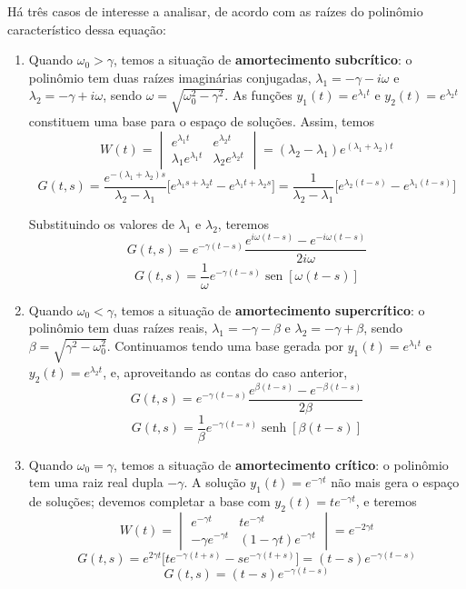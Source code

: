\documentclass[12pt,a4paper,oneside]{memoir}
\DeclareMathOperator{\sen}{sen}
\DeclareMathOperator{\senh}{senh}
\begin{document}
Há três casos de interesse a analisar, de acordo com as raízes do polinômio característico dessa equação:
\begin{enumerate}

  \item Quando $\omega_0 > \gamma$, temos a situação de \textbf{amortecimento subcrítico}: o polinômio tem duas raízes imaginárias conjugadas, $\lambda_1 = -\gamma - i\omega$ e $\lambda_2 = -\gamma + i\omega$, sendo $\omega = \sqrt{\omega_0^2 - \gamma^2}$.  As funções $y_1(t) = e^{\lambda_1 t}$ e $y_2(t) = e^{\lambda_2 t}$ constituem uma base para o espaço de soluções.  Assim, temos
  \[
    W(t)
    =
      \begin{vmatrix}
                  e^{\lambda_1 t}  &            e^{\lambda_2 t} \\
        \lambda_1 e^{\lambda_1 t}  &  \lambda_2 e^{\lambda_2 t}
      \end{vmatrix}
    =
      (\lambda_2 - \lambda_1) e^{(\lambda_1 + \lambda_2)t}
  \]
  \[
    G(t, s)
    =
      \frac{ e^{-(\lambda_1 + \lambda_2)s} }{ \lambda_2 - \lambda_1 }
      \Big[
        e^{\lambda_1 s + \lambda_2 t} -
        e^{\lambda_1 t + \lambda_2 s}
      \Big]
    =
      \frac{1}{ \lambda_2 - \lambda_1 }
      \Big[
        e^{\lambda_2 (t - s)} -
        e^{\lambda_1 (t - s)}
      \Big]
  \]

  Substituindo os valores de $\lambda_1$ e $\lambda_2$, teremos
  \[
    G(t, s) = e^{-\gamma(t - s)} \frac{e^{i\omega(t - s)} - e^{-i\omega(t - s)}}{2i\omega}
  \]
  \[
    G(t, s) = \frac{1}{\omega} e^{-\gamma(t - s)} \sen [\omega(t-s)]
  \]

  \item Quando $\omega_0 < \gamma$, temos a situação de \textbf{amortecimento supercrítico}: o polinômio tem duas raízes reais, $\lambda_1 = -\gamma - \beta$ e $\lambda_2 = -\gamma + \beta$, sendo $\beta = \sqrt{\gamma^2 - \omega_0^2}$.  Continuamos tendo uma base gerada por $y_1(t) = e^{\lambda_1 t}$ e $y_2(t) = e^{\lambda_2 t}$, e, aproveitando as contas do caso anterior,
  \[
    G(t, s) = e^{-\gamma(t - s)} \frac{e^{\beta(t - s)} - e^{-\beta(t - s)}}{2\beta}
  \]
  \[
    G(t, s) = \frac{1}{\beta} e^{-\gamma(t - s)} \senh [\beta(t-s)]
  \]

  \item Quando $\omega_0 = \gamma$, temos a situação de \textbf{amortecimento crítico}: o polinômio tem uma raiz real dupla $-\gamma$.  A solução $y_1(t) = e^{-\gamma t}$ não mais gera o espaço de soluções; devemos completar a base com $y_2(t) = t e^{-\gamma t}$, e teremos
  \[
    W(t)
    =
      \begin{vmatrix}
                e^{-\gamma t}  &          t e^{-\gamma t} \\
        -\gamma e^{-\gamma t}  &  (1 - \gamma t) e^{-\gamma t}
      \end{vmatrix}
    =
      e^{-2\gamma t}
  \]
  \[
    G(t, s)
    =
      e^{2\gamma t}
      \Big[
        te^{-\gamma(t + s)} -
        se^{-\gamma(t + s)}
      \Big]
    =
      (t - s) e^{-\gamma(t - s)}
  \]
  \[
    G(t, s) = (t - s) e^{-\gamma(t - s)}
  \]


\end{enumerate}
\end{document}

